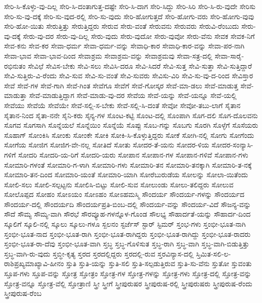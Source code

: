 ಸೇರಿ-ಸಿ-ಕೊಳ್ಳು-ವು-ದಿಲ್ಲ
ಸೇರಿ-ಸಿ-ದಂತಾಗುತ್ತ-ದಷ್ಟೇ
ಸೇರಿ-ಸಿ-ದಾಗ
ಸೇರಿ-ಸಿದ್ದು
ಸೇರಿ-ಸಿರಿ
ಸೇರಿ-ಸಿ-ರು-ವುದೇ
ಸೇರಿಸು
ಸೇರಿ-ಸು-ವು-ದಕ್ಕೆ
ಸೇರಿ-ಸು-ವುದ-ರಲ್ಲಿ
ಸೇರಿ-ಸು-ವುದು
ಸೇರಿ-ಹೋಗುತ್ತದೆ
ಸೇರಿ-ಹೋಗು-ವರು
ಸೇರಿ-ಹೋಗು-ವುವು
ಸೇರಿ-ಹೋ-ಯಿತು
ಸೇರುತ್ತಿತ್ತು
ಸೇರುತ್ತಿದ್ದರು
ಸೇರುವ
ಸೇರು-ವಂತೆ
ಸೇರುವನು
ಸೇರುವರು
ಸೇರುವಿ-ರೆಂಬುದು
ಸೇರು-ವು-ದಕ್ಕೆ
ಸೇರು-ವು-ದರ
ಸೇರು-ವು-ದಿಲ್ಲ
ಸೇರು-ವುದು
ಸೇರು-ವುದೋ
ಸೇರು-ವುವೋ
ಸೇರು-ವೆನು
ಸೇವಕ
ಸೇವಕ-ನಿಗೆ
ಸೇವ-ಕನು
ಸೇವ-ಕರ
ಸೇವಾ-ಧರ್ಮ
ಸೇವಾ-ಧರ್ಮ-ವನ್ನು
ಸೇವಾಧಿ-ಕಾರ
ಸೇವಾಧಿ-ಕಾರ-ವನ್ನು
ಸೇವಾ-ಪರ-ನಾಗಿ
ಸೇವಾ-ಭಾವ
ಸೇವಾ-ಭಾವ-ದಿಂದ
ಸೇವಾಶ್ರಮ
ಸೇವಾಶ್ರಮ-ವನ್ನು
ಸೇವಾಶ್ರಮವು
ಸೇವಾ-ಸತ್ರ-ದಲ್ಲಿ
ಸೇವಾ-ಸಾರೈ-ರಭಿನುತಂ
ಸೇವಿಛೆ
ಸೇವಿಸ-ಬೇಕು
ಸೇವಿ-ಸಲು
ಸೇವಿಸಿ-ದರೂ
ಸೇವಿ-ಸಿದರೆ
ಸೇವಿ-ಸುತ್ತ
ಸೇವಿ-ಸುತ್ತಾ
ಸೇವಿ-ಸುತ್ತಿದ್ದಾರೆ
ಸೇವಿ-ಸುತ್ತಿರು-ವಿ-ರೆಂದು
ಸೇವಿ-ಸುವ
ಸೇವಿ-ಸು-ವಂತೆ
ಸೇವಿ-ಸುವರು
ಸೇವಿಸು-ವಿರಿ
ಸೇವಿ-ಸು-ವು-ದ-ರಿಂದ
ಸೇವಿಸ್ತಾರ
ಸೇವೆ
ಸೇವೆ-ಗಳ
ಸೇವೆ-ಗಾಗಿ
ಸೇವೆ-ಗಿಂತ
ಸೇವೆಗೂ
ಸೇವೆಗೆ
ಸೇವೆ-ಗೋಸ್ಕರ
ಸೇವೆ-ಮಾ-ಡಲು
ಸೇವೆ-ಮಾಡುತ್ತ
ಸೇವೆ-ಮಾಡುತ್ತಾ
ಸೇವೆ-ಮಾಡುತ್ತಿದ್ದಾಗ
ಸೇವೆ-ಮಾಡು-ವು-ದರ
ಸೇವೆಯ
ಸೇವೆ-ಯನ್ನು
ಸೇವೆ-ಯನ್ನೂ
ಸೇವೆ-ಯಲ್ಲಿ
ಸೇವೆಯು
ಸೇವೆಯೆ
ಸೇವೆಯೇ
ಸೇವೆ-ಸಲ್ಲಿ-ಸ-ಬೇಕು
ಸೇವೆ-ಸಲ್ಲಿ-ಸಿ-ದಂತೆ
ಸೇವೋ
ಸೇವೋ-ತಬು-ಲಾಗೆ
ಸೈತಾನ
ಸೈತಾನ-ನಿಂದ
ಸೈತಾ-ನನೇ
ಸೈನಿ-ಕರು
ಸೈನ್ಯ-ಗಳ
ಸೊಂಟ-ಕಟ್ಟಿ
ಸೊಂಟ-ದಲ್ಲಿ
ಸೊಂಪಾಗಿ
ಸೊಗ-ದಲಿ
ಸೊಗ-ದೊಲವನು
ಸೊಗವ
ಸೊಗಸಾಗಿ
ಸೊನ್ನೆಯಲೆ
ಸೊನ್ನೆಯಿಂ
ಸೊನ್ನೆಯೆ
ಸೊಪ್ಪು
ಸೊಬ-ಗನ್ನು
ಸೊಬಗು
ಸೊರಗಿ
ಸೊಳ್ಳೆಗೆ
ಸೊಸೆಯರು
ಸೊಹಾಗ್
ಸೋಂಕಿಸಿ
ಸೋಂಕು
ಸೋಂಕೇ
ಸೋಕಿ
ಸೋಕಿ-ಸಿ-ಕೊಳ್ಳುತ್ತಿದ್ದರು
ಸೋಕೆ
ಸೋಗಿ-ನಲ್ಲಿ
ಸೋಗು
ಸೋಗೆಂದು
ಸೋಗೆಯ
ಸೋಜಿಗ
ಸೋಜಿಗ-ವೇ-ನಲ್ಲ
ಸೋತಿದೆ
ಸೋತು
ಸೋದರ-ತೆ-ಯನು
ಸೋದರ-ಳಿಯ
ಸೋದರ-ಸಂನ್ಯಾಸಿ-ಗಳಿಗೆ
ಸೋದರಿ
ಸೋದರಿ-ಯ-ರಿಗೆ
ಸೋದರಿ-ಯರು
ಸೋಪಾನ
ಸೋಪಾನ-ಗಳ
ಸೋಪಾನ-ಗಳಿವೆ
ಸೋಪಾನ-ಗಳು
ಸೋಮಾರಿ-ಗಳಂತೆ
ಸೋಮಾರಿ-ಗ-ಳಾಗಿ
ಸೋಮಾರಿ-ಗಳು
ಸೋಮಾರಿ-ತನ
ಸೋಮಾರಿ-ತನಕ್ಕಾಗಿ
ಸೋಮಾರಿ-ತ-ನಕ್ಕೆ
ಸೋಮಾರಿ-ತನ-ದಿಂದ
ಸೋಮಾರಿ-ಯಂತೆ
ಸೋಮಾರಿ-ಯಾಗಿ
ಸೋರೆಬುರುಡೆಯ
ಸೋಲನ್ನು
ಸೋಲಾ-ಯಿತೆಂದು
ಸೋಲಿ-ಸಲು
ಸೋಲಿ-ಸಲ್ಪಟ್ಟನು
ಸೋಲಿಸಿ-ಬಿಟ್ಟು
ಸೋಲಿ-ಸುವ
ಸೋಲುಂಡು
ಸೋಲು-ತಲಿದ್ದರು
ಸೋಲುವ
ಸೋಲೊಪ್ಪದ
ಸೋಹಂ
ಸೋಽಯಂ
ಸೋಽಹಂ
ಸೋಽಹಮಸ್ಮಿ
ಸೌಂದರ್ಯ
ಸೌಂದರ್ಯ-ಗಳನ್ನು
ಸೌಂದರ್ಯದ
ಸೌಂದರ್ಯ-ದಲ್ಲಿ
ಸೌಂದರ್ಯದಿ
ಸೌಂದರ್ಯಪ್ರತಿ-ಬಿಂಬ-ದಲ್ಲಿ
ಸೌಂದರ್ಯ-ವನ್ನು
ಸೌಂದರ್ಯ-ವಿದೆ
ಸೌಜನ್ಯ-ವನ್ನು
ಸೌದೆ
ಸೌಮ್ಯ
ಸೌಮ್ಯ-ವಾಗಿ
ಸೌರಭೆ
ಸೌರವ್ಯೂಹ-ಗಳನ್ನೊಳ-ಗೊಂಡ
ಸೌಲಭ್ಯ
ಸೌಹಾರ್ದತೆ-ಯನ್ನು
ಸೌಹಾರ್ದ-ದಿಂದ
ಸ್ಕೂಲಿಗೆ
ಸ್ಕೂಲಿ-ನಲ್ಲಿ
ಸ್ಕೂಲು
ಸ್ಕೂಲು-ಗಳೂ
ಸ್ಖಲನಂ
ಸ್ಟರ್ಜೆಸ್
ಸ್ಟಾರ್
ಸ್ಟಿಮರ್
ಸ್ತಂಭ-ಗಳು
ಸ್ತಂಭೀ-ಭೂತ-ನಾಗಿ
ಸ್ತಂಭೀ-ಭೂತ-ನಾದ
ಸ್ತಂಭೀ-ಭೂತ-ರಾಗಿ
ಸ್ತಂಭೀ-ಭೂತ-ರಾಗಿದ್ದರು
ಸ್ತಂಭೀ-ಭೂತ-ರಾಗಿದ್ದು
ಸ್ತಂಭೀ-ಭೂತ-ರಾದರು
ಸ್ತಂಭೀ-ಭೂತ-ರಾ-ದೆವು
ಸ್ತಂಭೀ-ಭೂತ-ವಾಗಿ
ಸ್ತಬ್ಧ
ಸ್ತಬ್ಧ-ಗೊಳಿಸುತ
ಸ್ತಬ್ಧ-ರಾಗಿ
ಸ್ತಬ್ಧ-ವಾಗಿ
ಸ್ತಬ್ಧ-ವಾಗಿ-ಬಿಡುತ್ತಿತ್ತು
ಸ್ತಬ್ಧ-ವಾಗಿ-ರು-ವುದು
ಸ್ತಬ್ಧೀ-ಕೃತ್ಯ
ಸ್ತರದ
ಸ್ತರದಲ್ಲಿದ್ದರು
ಸ್ತರದಲ್ಲಿ-ರುವ
ಸ್ತರವಿನ್ಯಾಸ-ದಲ್ಲಿ
ಸ್ತಿಮಿತ-ಸಲಿ-ಲ-ರಾಶಿಪ್ರಖ್ಯಮಾಖ್ಯಾವಿ-ಹೀನಂ
ಸ್ತುತಿ
ಸ್ತುತಿ-ಯನ್ನು
ಸ್ತುತಿ-ಸಲಿ
ಸ್ತುತಿ-ಸಲ್ಪಡುತ್ತಿರುವ
ಸ್ತುತಿ-ಸು-ವೆನು
ಸ್ತುತೋ
ಸ್ತುವಂತು
ಸ್ತೂಪ-ಗಳು
ಸ್ತೂಪ-ವನ್ನು
ಸ್ತೋತ್ರ
ಸ್ತೋತ್ರಂ
ಸ್ತೋತ್ರ-ಗಳ
ಸ್ತೋತ್ರ-ಗಳನ್ನು
ಸ್ತೋತ್ರ-ಗಳು
ಸ್ತೋತ್ರ-ದಲ್ಲಿ
ಸ್ತೋತ್ರ-ವನ್ನು
ಸ್ತೋತ್ರ-ವನ್ನೂ
ಸ್ತೋತ್ರ-ವೆಲ್ಲಿ
ಸ್ತೋತ್ರಾಣಿ
ಸ್ತ್ರೀ
ಸ್ತ್ರೀಗೆ
ಸ್ತ್ರೀಪುರುಷರ
ಸ್ತ್ರೀಪುರುಷ-ರಲ್ಲಿ
ಸ್ತ್ರೀಪುರುಷರು
ಸ್ತ್ರೀಪುರುಷ-ರೆಂದು
ಸ್ತ್ರೀಪುರುಷ-ರೆಂಬ
